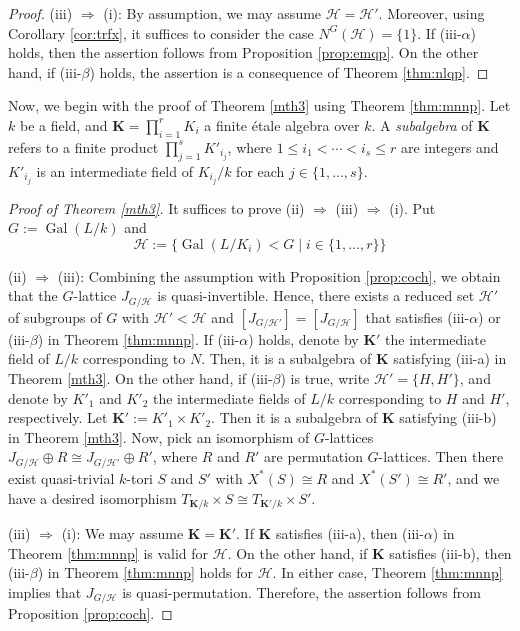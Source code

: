 \documentclass[12pt]{amsart}
\theoremstyle{plain}
\theoremstyle{definition}
\numberwithin{thm}{section}
\numberwithin{equation}{section}
\newcommand{\bK}{\mathbf{K}}
\newcommand{\cH}{\mathcal{H}}
\DeclareMathOperator{\Gal}{Gal}
\begin{document}
\begin{proof}
(iii) $\Rightarrow$ (i): By assumption, we may assume $\cH=\cH'$. Moreover, using Corollary \ref{cor:trfx}, it suffices to consider the case $N^{G}(\cH)=\{1\}$. If (iii-$\alpha$) holds, then the assertion follows from Proposition \ref{prop:emqp}. On the other hand, if (iii-$\beta$) holds, the assertion is a consequence of Theorem \ref{thm:nlqp}. 
\end{proof}

Now, we begin with the proof of Theorem \ref{mth3} using Theorem \ref{thm:mnnp}. Let $k$ be a field, and $\bK=\prod_{i=1}^{r}K_{i}$ a finite {\'e}tale algebra over $k$. A \emph{subalgebra} of $\bK$ refers to a finite product $\prod_{j=1}^{s}K'_{i_{j}}$, where $1\leq i_{1}<\cdots<i_{s}\leq r$ are integers and $K'_{i_{j}}$ is an intermediate field of $K_{i_{j}}/k$ for each $j\in \{1,\ldots,s\}$. 

\begin{proof}[Proof of Theorem \ref{mth3}]
It suffices to prove (ii) $\Rightarrow$ (iii) $\Rightarrow$ (i). Put $G:=\Gal(L/k)$ and 
\begin{equation*}
    \cH:=\{\Gal(L/K_{i})<G\mid i\in \{1,\ldots,r\}\}
\end{equation*}

(ii) $\Rightarrow$ (iii): Combining the assumption with Proposition \ref{prop:coch}, we obtain that the $G$-lattice $J_{G/\cH}$ is quasi-invertible. Hence, there exists a reduced set $\cH'$ of subgroups of $G$ with $\cH'<\cH$ and $[J_{G/\cH'}]=[J_{G/\cH}]$ that satisfies (iii-$\alpha$) or (iii-$\beta$) in Theorem \ref{thm:mnnp}. If (iii-$\alpha$) holds, denote by $\bK'$ the intermediate field of $L/k$ corresponding to $N$. Then, it is a subalgebra of $\bK$ satisfying (iii-a) in Theorem \ref{mth3}. On the other hand, if (iii-$\beta$) is true, write $\cH'=\{H,H'\}$, and denote by $K'_{1}$ and $K'_{2}$ the intermediate fields of $L/k$ corresponding to $H$ and $H'$, respectively. Let $\bK':=K'_{1}\times K'_{2}$. Then it is a subalgebra of $\bK$ satisfying (iii-b) in Theorem \ref{mth3}. Now, pick an isomorphism of $G$-lattices $J_{G/\cH}\oplus R\cong J_{G/\cH'}\oplus R'$, where $R$ and $R'$ are permutation $G$-lattices. Then there exist quasi-trivial $k$-tori $S$ and $S'$ with $X^{*}(S)\cong R$ and $X^{*}(S')\cong R'$, and we have a desired isomorphism $T_{\bK/k}\times S\cong T_{\bK'/k}\times S'$. 

(iii) $\Rightarrow$ (i): We may assume $\bK=\bK'$. If $\bK$ satisfies (iii-a), then (iii-$\alpha$) in Theorem \ref{thm:mnnp} is valid for $\cH$. On the other hand, if $\bK$ satisfies (iii-b), then (iii-$\beta$) in Theorem \ref{thm:mnnp} holds for $\cH$. In either case, Theorem \ref{thm:mnnp} implies that $J_{G/\cH}$ is quasi-permutation. Therefore, the assertion follows from Proposition \ref{prop:coch}. 
\end{proof}
\end{document}
